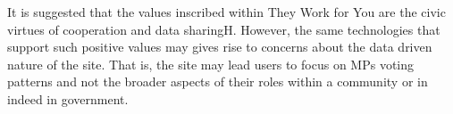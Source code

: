 It is suggested that the values inscribed within They Work for You are the civic virtues of cooperation and data sharingH.
However, the same technologies that support such positive values may gives rise to concerns about the data driven nature of the site.
That is, the site may lead users to focus on MPs voting patterns and not the broader aspects of their roles within a community or in indeed in government.